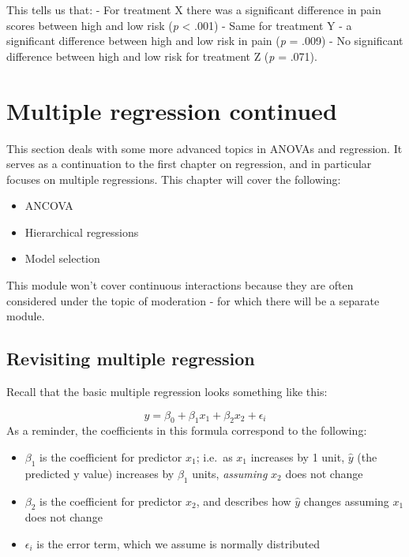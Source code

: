 \documentclass[
]{book}
\providecommand{\tightlist}{%
  \setlength{\itemsep}{0pt}\setlength{\parskip}{0pt}}
\begin{document}
This tells us that:
- For treatment X there was a significant difference in pain scores between high and low risk (\emph{p} \textless{} .001)
- Same for treatment Y - a significant difference between high and low risk in pain (\emph{p} = .009)
- No significant difference between high and low risk for treatment Z (\emph{p} = .071).

\hypertarget{multiple-regression-continued}{%
\chapter{Multiple regression continued}\label{multiple-regression-continued}}

This section deals with some more advanced topics in ANOVAs and regression. It serves as a continuation to the first chapter on regression, and in particular focuses on multiple regressions. This chapter will cover the following:

\begin{itemize}
\tightlist
\item
  ANCOVA
\item
  Hierarchical regressions
\item
  Model selection
\end{itemize}

This module won't cover continuous interactions because they are often considered under the topic of moderation - for which there will be a separate module.

\hypertarget{revisiting-multiple-regression}{%
\section{Revisiting multiple regression}\label{revisiting-multiple-regression}}

Recall that the basic multiple regression looks something like this:

\[
y = \beta_0 + \beta_1x_1 +\beta_2x_2 + \epsilon_i
\]
As a reminder, the coefficients in this formula correspond to the following:

\begin{itemize}
\tightlist
\item
  \(\beta_1\) is the coefficient for predictor \(x_1\); i.e.~as \(x_1\) increases by 1 unit, \(\hat y\) (the predicted y value) increases by \(\beta_1\) units, \emph{assuming} \(x_2\) does not change
\item
  \(\beta_2\) is the coefficient for predictor \(x_2\), and describes how \(\hat y\) changes assuming \(x_1\) does not change
\item
  \(\epsilon_i\) is the error term, which we assume is normally distributed
\end{itemize}
\end{document}
